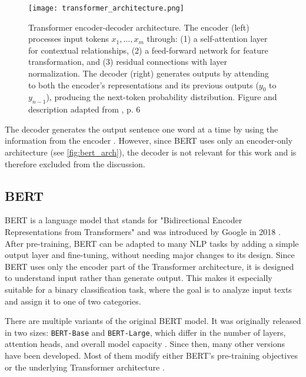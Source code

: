 \begin{figure}[ht]
    \centering
	\texttt{[image: transformer\_architecture.png]}	
        \caption[Transformer encoder-decoder architecture overview]{Transformer encoder-decoder architecture. The encoder (left) processes input tokens \(x_1,\dots,x_m\) through: (1) a self-attention layer for contextual relationships, (2) a feed-forward network for feature transformation, and (3) residual connections with layer normalization. The decoder (right) generates outputs by attending to both the encoder's representations and its previous outputs ($y_0$ to $y_{n-1}$), producing the next-token probability distribution. Figure and description adapted from \textcite{xiaoIntroductionTransformersNLP2023}, p. 6}
    \label{fig:transformer_architecture}
\end{figure}

The decoder generates the output sentence one word at a time by using the information from the encoder \parencite{xiaoIntroductionTransformersNLP2023}. However, since BERT uses only an encoder-only architecture (see \autoref{fig:bert_arch}), the decoder is not relevant for this work and is therefore excluded from the discussion.

\subsection{BERT}
    BERT is a language model that stands for "Bidirectional Encoder Representations from Transformers" and was introduced by Google in 2018 \parencite{devlinBERTPretrainingDeep2019}. After pre-training, BERT can be adapted to many NLP tasks by adding a simple output layer and fine-tuning, without needing major changes to its design. Since BERT uses only the encoder part of the Transformer architecture, it is designed to understand input rather than generate output. This makes it especially suitable for a binary classification task, where the goal is to analyze input texts and assign it to one of two categories.

    There are multiple variants of the original BERT model. It was originally released in two sizes: \texttt{BERT-Base} and \texttt{BERT-Large}, which differ in the number of layers, attention heads, and overall model capacity \parencite{devlinBERTPretrainingDeep2019}. Since then, many other versions have been developed. Most of them modify either BERT’s pre-training objectives or the underlying Transformer architecture \parencite{libovickyHowLanguageNeutralMultilingual2019}.

